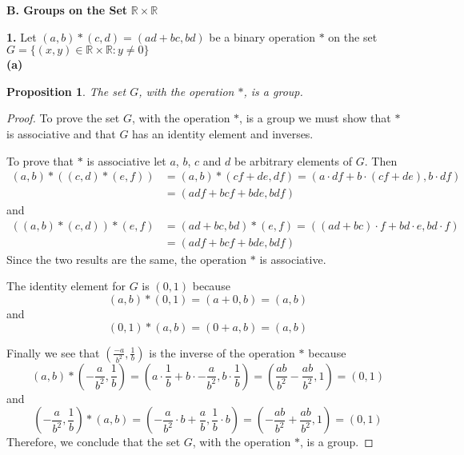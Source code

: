 \documentclass[12pt]{article}   %
\newtheorem*{proposition}{Proposition}  %
\begin{document}
\noindent\textbf{B. Groups on the Set} $\mathbb{R} \times \mathbb{R}$ \smallskip

\noindent\textbf{1.} \quad Let $(a,b)*(c,d) = (ad+bc,bd)$ be a binary operation $*$ on the set $G = \{(x,y) \in \mathbb{R} \times \mathbb{R}: y \neq 0\}$ \\

\noindent\textbf{(a)}
\begin{proposition}
The set $G$, with the operation $\ast$, is a group.
\end{proposition}
\begin{proof}
To prove the set $G$, with the operation $\ast$, is a group we must show that $\ast$ is associative and that $G$ has an identity element and inverses.

To prove that $*$ is associative let $a$, $b$, $c$ and $d$ be arbitrary elements of $G$. Then
\begin{align*}
(a,b)*((c,d)*(e,f)) &= (a,b)*(cf + de, df) = (a \cdot df + b \cdot (cf + de), b \cdot df) \\
&= (adf + bcf + bde, bdf)
\end{align*}
and
\begin{align*}
((a,b)*(c,d))*(e,f) &= (ad + bc, bd) * (e,f) = ((ad + bc) \cdot f + bd \cdot e, bd \cdot f) \\
&= (adf + bcf + bde, bdf)
\end{align*}
Since the two results are the same, the operation $*$ is associative.

The identity element for $G$ is $(0,1)$ because
\begin{equation*}
(a,b) * (0,1) = (a + 0, b) = (a,b)
\end{equation*}
and
\begin{equation*}
(0,1) * (a,b) = (0 + a, b) = (a,b)
\end{equation*}

Finally we see that $(\tfrac{-a}{b^2}, \tfrac{1}{b})$ is the inverse of the operation $\ast$ because
\begin{equation*}
(a,b) * \left(-\frac{a}{b^2}, \frac{1}{b} \right) = \left(a \cdot \frac{1}{b} + b \cdot -\frac{a}{b^2}, b \cdot \frac{1}{b} \right) = \left( \frac{ab}{b^2} - \frac{ab}{b^2}, 1 \right) = (0,1)
\end{equation*}
and
\begin{equation*}
\left( -\frac{a}{b^2}, \frac{1}{b} \right) * (a,b) = \left( -\frac{a}{b^2} \cdot b + \frac{a}{b}, \frac{1}{b} \cdot b \right) = \left( -\frac{ab}{b^2} + \frac{ab}{b^2}, 1 \right) = (0,1)
\end{equation*}
Therefore, we conclude that the set $G$, with the operation $\ast$, is a group.
\end{proof}
\end{document}
